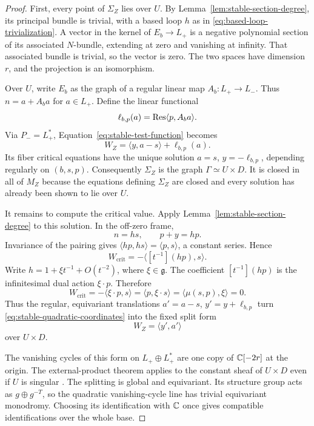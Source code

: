 \begin{proof}
First, every point of $\Sigma_Z$ lies over $U$.  By
Lemma~\ref{lem:stable-section-degree}, its principal bundle is trivial,
with a based loop $h$ as in \eqref{eq:based-loop-trivialization}.
A vector in the kernel of $E_b\to L_+$ is a negative polynomial section
of its associated $N$-bundle, extending at zero and vanishing at
infinity.  That associated bundle is trivial, so the vector is zero.
The two spaces have dimension $r$, and the projection is an
isomorphism.

Over $U$, write $E_b$ as the graph of a regular linear map
$A_b:L_+\to L_-$.  Thus $n=a+A_ba$ for $a\in L_+$.  Define the linear
functional
\[
 \ell_{b,p}(a)=\operatorname{Res}\langle p,A_ba\rangle.
\]
Via $P_-=L_+^*$, Equation~\eqref{eq:stable-test-function} becomes
\begin{equation}
\label{eq:stable-quadratic-coordinates}
 W_Z=\langle y,a-s\rangle+\ell_{b,p}(a).
\end{equation}
Its fiber critical equations have the unique solution
$a=s$, $y=-\ell_{b,p}$, depending regularly on $(b,s,p)$.
Consequently $\Sigma_Z$ is the graph $\Gamma\simeq U\times D$.
It is closed in all of $M_Z$ because the equations defining $\Sigma_Z$ are
closed and every solution has already been shown to lie over $U$.

It remains to compute the critical value.  Apply
Lemma~\ref{lem:stable-section-degree} to this solution.  In the
off-zero frame,
\[
 n=hs,\qquad p+y=hp.
\]
Invariance of the pairing gives
$\langle hp,hs\rangle=\langle p,s\rangle$, a constant series.  Hence
\[
 W_{\mathrm{crit}}
 =-\langle[t^{-1}](hp),s\rangle.
\]
Write $h=1+\xi t^{-1}+O(t^{-2})$, where $\xi\in\mathfrak g$.
The coefficient $[t^{-1}](hp)$ is the infinitesimal dual action
$\xi\cdot p$.  Therefore
\begin{equation}
\label{eq:stable-critical-value}
 W_{\mathrm{crit}}
 =-\langle\xi\cdot p,s\rangle
 =\langle p,\xi\cdot s\rangle
 =\langle\mu(s,p),\xi\rangle=0.
\end{equation}
Thus the regular, equivariant translations
$a'=a-s$, $y'=y+\ell_{b,p}$ turn
\eqref{eq:stable-quadratic-coordinates} into the fixed split form
\[
 W_Z=\langle y',a'\rangle
\]
over $U\times D$.

The vanishing cycles of this form on $L_+\oplus L_+^*$ are one copy of
$\mathbb C[-2r]$ at the origin.  The external-product theorem applies to the
constant sheaf of $U\times D$ even if $U$ is singular
\cite[Theorem, pp.~1--2 of the arXiv preprint]{Massey99}.  The splitting is global and
equivariant.  Its structure group acts as $g\oplus g^{-T}$, so the
quadratic vanishing-cycle line has trivial equivariant monodromy.
Choosing its identification with $\mathbb C$ once gives compatible
identifications over the whole base.


\end{proof}
